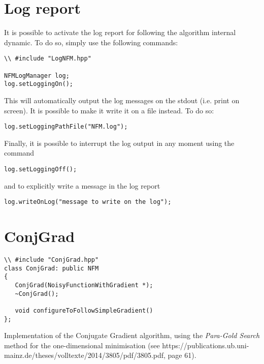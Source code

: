 \documentclass[11pt,a4paper,twoside]{article}
\begin{document}




\section{Log report} %
\label{sec:log_output}

It is possible to activate the log report for following the algorithm internal dynamic.
To do so, simply use the following commands:

\begin{lstlisting}
\\ #include "LogNFM.hpp"

NFMLogManager log;
log.setLoggingOn();
\end{lstlisting}

This will automatically output the log messages on the stdout (i.e. print on screen).
It is possible to make it write it on a file instead.
To do so:

\begin{lstlisting}
log.setLoggingPathFile("NFM.log");
\end{lstlisting}

Finally, it is possible to interrupt the log output in any moment using the command 
\begin{lstlisting}
log.setLoggingOff();
\end{lstlisting}
and to explicitly write a message in the log report
\begin{lstlisting}
log.writeOnLog("message to write on the log");
\end{lstlisting}




\section{ConjGrad} %
\label{sec:conjgrad}

\begin{lstlisting}
\\ #include "ConjGrad.hpp"
class ConjGrad: public NFM
{
   ConjGrad(NoisyFunctionWithGradient *);
   ~ConjGrad();
   
   void configureToFollowSimpleGradient()
};
\end{lstlisting}

Implementation of the Conjugate Gradient algorithm, using the \emph{Para-Gold Search} method for the one-dimensional minimisation (see https://publications.ub.uni-mainz.de/theses/volltexte/2014/3805/pdf/3805.pdf, page 61).
\end{document}
